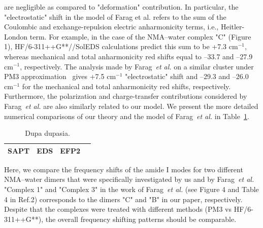 \documentclass[a4paper,titlepage,twoside,fleqn,12pt]{book}
\begin{document}
\begin{refsection}
are negligible as compared to "deformation" contribution.
In particular, the "electrostatic" shift in the model of Farag
et al. refers to the sum of the Coulombic and exchange\hyp{}repulsion
electric anharmonicity terms, i.e., Heitler\hyp{}London
term. For example, in the case of the NMA--water complex "C"
(Figure 1), HF/6-311++G**//SolEDS calculations predict
this sum to be +7.3 cm$^{-1}$, whereas mechanical and total
anharmonicity red shifts equal to --33.7 and --27.9 cm$^{-1}$,
respectively. The analysis made by Farag~\emph{et al.} on a similar
cluster under PM3 approximation~\citep{Stewart.JCC.1988} 
gives +7.5 cm$^{-1}$ "electrostatic"
shift and --29.3 and --26.0 cm$^{-1}$ for the mechanical and
total anharmonicity red shifts, respectively. Furthermore, the
polarization and charge\hyp{}transfer contributions considered by
Farag~\emph{et al.} are also similarly related to our model. 
We present the more detailed numerical
comparisons of our theory and the model of Farag~\emph{et al.} in
Table~\ref{t:farag}.
%
\begin{table}[t!]
\caption{
Dupa dupasia.
\label{t:farag}}
\begin{tabular*}{1.0\textwidth}{@{\extracolsep{\fill} } lccc}
\hline\hline
SAPT                     & EDS                             & EFP2   &            \\
\hline
\hline\hline
\end{tabular*}
\end{table}
%
Here, we compare the frequency shifts of the amide I modes for two different 
NMA--water dimers that were specifically investigated by us and by Farag~\emph{et al.} 
"Complex 1" and "Complex 3" in the work of Farag~\emph{et al.} 
(see Figure 4 and Table 4 in Ref.2) corresponds to the dimers "C" and "B" 
in our paper, respectively. Despite that the complexes were treated 
with different methods (PM3 vs HF/6-311++G**), the overall frequency shifting 
patterns should be comparable. 


\end{refsection}
\end{document}
